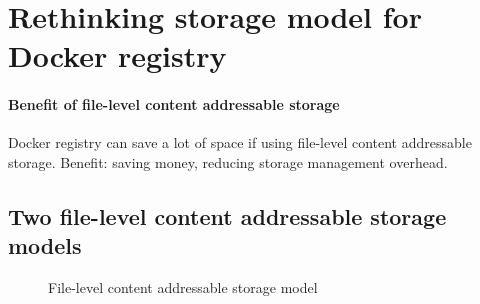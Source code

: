\section{Rethinking storage model for Docker registry}
\label{sec:file_adressable}

\paragraph{Benefit of file-level content addressable storage}
Docker registry can save a lot of space if using file-level content addressable storage. 
Benefit: saving money, reducing storage management overhead.

\subsection{Two file-level content addressable storage models}

\begin{figure}
	\centering
	\caption{File-level content addressable storage model}
	\label{fig:eval-stdev-erasure-cnt}
\end{figure}

